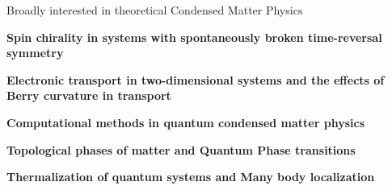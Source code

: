 

\begin{cventries}

  \cventry
    {} %
    {Broadly interested in theoretical Condensed Matter Physics} %
    {} %
    {} %
    {
      \begin{cvitems} %
      	\item {\textbf{Spin chirality in systems with spontaneously broken time-reversal symmetry}}
      	\item {\textbf{Electronic transport in two-dimensional systems and the effects of Berry curvature in transport}}
        \item {\textbf{Computational methods in quantum condensed matter physics}}
        \item {\textbf{Topological phases of matter and Quantum Phase transitions}}
        \item {\textbf{Thermalization of quantum systems and Many body localization}}
      \end{cvitems}
    }

\end{cventries}
